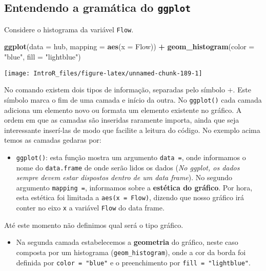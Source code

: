 \documentclass[
]{book}
\newenvironment{Shaded}{\begin{snugshade}}{\end{snugshade}}
\newcommand{\DataTypeTok}[1]{\textcolor[rgb]{0.13,0.29,0.53}{#1}}
\newcommand{\KeywordTok}[1]{\textcolor[rgb]{0.13,0.29,0.53}{\textbf{#1}}}
\newcommand{\NormalTok}[1]{#1}
\newcommand{\OperatorTok}[1]{\textcolor[rgb]{0.81,0.36,0.00}{\textbf{#1}}}
\newcommand{\StringTok}[1]{\textcolor[rgb]{0.31,0.60,0.02}{#1}}
\providecommand{\tightlist}{%
  \setlength{\itemsep}{0pt}\setlength{\parskip}{0pt}}
\begin{document}
\hypertarget{entendendo-a-gramuxe1tica-do-ggplot}{%
\subsection{\texorpdfstring{Entendendo a gramática do \texttt{ggplot}}{Entendendo a gramática do ggplot}}\label{entendendo-a-gramuxe1tica-do-ggplot}}

Considere o histograma da variável \texttt{Flow}.

\begin{Shaded}
\begin{Highlighting}[]
\KeywordTok{ggplot}\NormalTok{(}\DataTypeTok{data =}\NormalTok{ hub, }\DataTypeTok{mapping =} \KeywordTok{aes}\NormalTok{(}\DataTypeTok{x =}\NormalTok{ Flow)) }\OperatorTok{+}
\StringTok{  }\KeywordTok{geom_histogram}\NormalTok{(}\DataTypeTok{color =} \StringTok{"blue"}\NormalTok{, }\DataTypeTok{fill =} \StringTok{"lightblue"}\NormalTok{)}
\end{Highlighting}
\end{Shaded}

\begin{center}\texttt{[image: IntroR\_files/figure-latex/unnamed-chunk-189-1]} \end{center}

No comando existem dois tipos de informação, separadas pelo símbolo \(+\). Este símbolo marca o fim de uma camada e início da outra. No \texttt{ggplot()} cada camada adiciona um elemento novo ou formata um elemento existente no gráfico. A ordem em que as camadas são inseridas raramente importa, ainda que seja interessante inserí-las de modo que facilite a leitura do código. No exemplo acima temos as camadas gedaras por:

\begin{itemize}
\tightlist
\item
  \texttt{ggplot()}: esta função mostra um argumento \texttt{data\ =}, onde informamos o nome do \texttt{data.frame} de onde serão lidos os dados (\emph{No ggplot, os dados sempre devem estar dispostos dentro de um data frame}). No segundo argumento \texttt{mapping\ =}, informamos sobre a \textbf{estética do gráfico}. Por hora, esta estética foi limitada a \texttt{aes(x\ =\ Flow)}, dizendo que nosso gráfico irá conter no eixo \texttt{x} a variável \texttt{Flow} do data frame.
\end{itemize}

Até este momento não definimos qual será o tipo gráfico.

\begin{itemize}
\tightlist
\item
  Na segunda camada estabelecemos a \textbf{geometria} do gráfico, neste caso composta por um histograma (\texttt{geom\_histogram}), onde a cor da borda foi definida por \texttt{color\ =\ "blue"} e o preenchimento por \texttt{fill\ =\ "lightblue"}.
\end{itemize}
\end{document}
